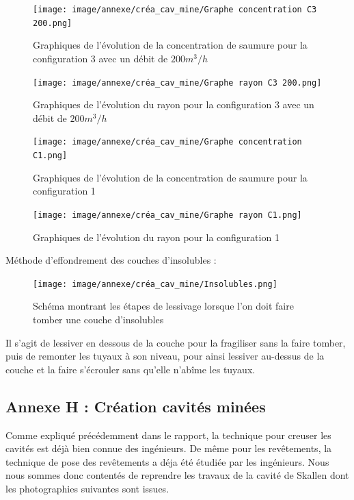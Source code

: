 \documentclass[11pt,french,a4paper]{article}
\begin{document}
\begin{figure}[!h]
  \centering
  \texttt{[image: image/annexe/créa\_cav\_mine/Graphe concentration C3 200.png]}
  \caption{Graphiques de l'évolution de la concentration de saumure pour la configuration 3 avec un débit de $200m^3/h$}
  \end{figure}

\begin{figure}[!h]
  \centering
  \texttt{[image: image/annexe/créa\_cav\_mine/Graphe rayon C3 200.png]}
  \caption{Graphiques de l'évolution du rayon pour la configuration 3 avec un débit de $200m^3/h$}
  \end{figure}

\begin{figure}[!h]
  \centering
  \texttt{[image: image/annexe/créa\_cav\_mine/Graphe concentration C1.png]}
  \caption{Graphiques de l'évolution de la concentration de saumure pour la configuration 1}
  \end{figure}

\begin{figure}[!h]
  \centering
  \texttt{[image: image/annexe/créa\_cav\_mine/Graphe rayon C1.png]}
  \caption{Graphiques de l'évolution du rayon pour la configuration 1}
  \end{figure}

Méthode d’effondrement des couches d’insolubles :

\begin{figure}[!h]
  \centering
  \texttt{[image: image/annexe/créa\_cav\_mine/Insolubles.png]}
  \caption{Schéma montrant les étapes de lessivage lorsque l’on doit faire tomber une couche d’insolubles }
  \end{figure}

Il s’agit de lessiver en dessous de la couche pour la fragiliser sans la faire tomber, puis de remonter les tuyaux à son niveau, pour ainsi lessiver au-dessus de la couche et la faire s’écrouler sans qu’elle n’abîme les tuyaux. 

\FloatBarrier
\subsection*{Annexe H : Création cavités minées}
Comme expliqué précédemment dans le rapport, la technique pour creuser les cavités est déjà bien connue des ingénieurs. De même pour les revêtements, la technique de pose des revêtements a déja été étudiée par les ingénieurs. Nous nous sommes donc contentés de reprendre les travaux de la cavité de Skallen dont les photographies suivantes sont issues.
\end{document}
